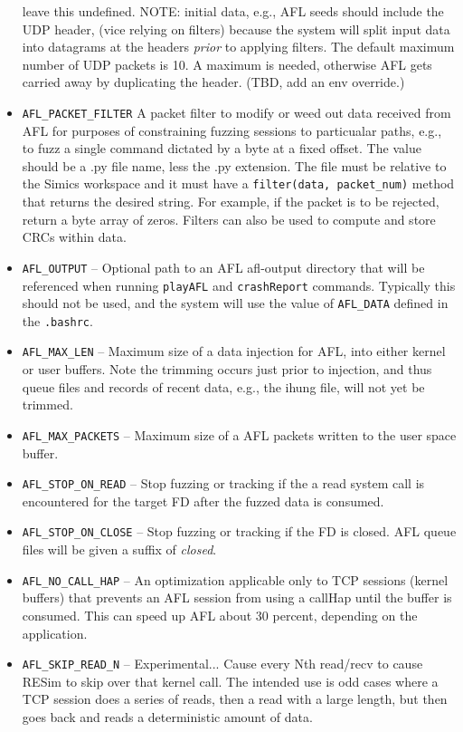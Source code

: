 \documentclass[titlepage]{article}
\begin{document}
\begin{itemize}
leave this undefined. NOTE: initial data, e.g., AFL seeds should include the UDP header, (vice relying on filters) because the system will split input data into datagrams at the
headers \textit{prior} to applying filters.  The default maximum number of UDP packets is 10.  A maximum is needed, otherwise AFL gets carried away by duplicating
the header.  (TBD, add an env override.)
\item{\tt AFL\_PACKET\_FILTER} A packet filter to modify or weed out data received from AFL for purposes of constraining fuzzing sessions to
particualar paths, e.g., to fuzz a single command dictated by a byte at a fixed offset.  The value should be a .py file name, less the
.py extension.  The file must be relative to the Simics workspace and it must have a {\tt filter(data, packet\_num)} method that returns
the desired string.  For example, if the packet is to be rejected, return a byte array of zeros.  Filters can also be used to 
compute and store CRCs within data.  
\item {\tt AFL\_OUTPUT} -- Optional path to an AFL afl-output directory that will be referenced when running {\tt playAFL} and {\tt crashReport} commands. Typically this should not be used, and the system will use the value of {\tt AFL\_DATA} defined in the {\tt .bashrc}.
\item {\tt AFL\_MAX\_LEN} -- Maximum size of a data injection for AFL, into either kernel or user buffers. Note the trimming occurs just prior to injection,
and thus queue files and records of recent data, e.g., the ihung file, will not yet be trimmed.
\item {\tt AFL\_MAX\_PACKETS} -- Maximum size of a AFL packets written to the user space buffer.
\item {\tt AFL\_STOP\_ON\_READ} -- Stop fuzzing or tracking if the a read system call is encountered for the target FD after the fuzzed data is consumed.
\item {\tt AFL\_STOP\_ON\_CLOSE} -- Stop fuzzing or tracking if the FD is closed.  AFL queue files will be given a suffix of \textit{closed}.
\item {\tt AFL\_NO\_CALL\_HAP} -- An optimization applicable only to TCP sessions (kernel buffers) that prevents an AFL session 
from using a callHap until the buffer is consumed.  This can speed up AFL about 30 percent, depending on the application.
\item {\tt AFL\_SKIP\_READ\_N} -- Experimental... Cause every Nth read/recv to cause RESim to skip over that kernel call.  The intended use is odd
cases where a TCP session does a series of reads, then a read with a large length, but then goes back and reads a deterministic amount of data.


\end{itemize}
\end{document}
